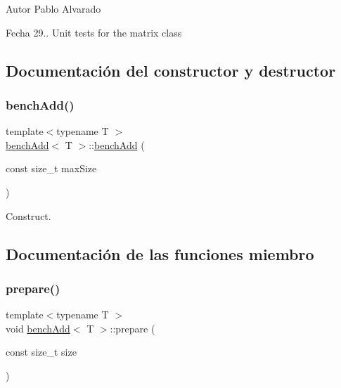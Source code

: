 \begin{DoxyAuthor}{Autor}
Pablo Alvarado 
\end{DoxyAuthor}
\begin{DoxyDate}{Fecha}
29.. Unit tests for the matrix class 
\end{DoxyDate}


\subsection{Documentación del constructor y destructor}
\mbox{\label{classbenchAdd_a87c319715895c7741c5450232a80a54d}} 
\subsubsection{\texorpdfstring{bench\+Add()}{benchAdd()}}
{\footnotesize\ttfamily template$<$typename T $>$ \\
\hyperlink{classbenchAdd}{bench\+Add}$<$ T $>$\+::\hyperlink{classbenchAdd}{bench\+Add} (\begin{DoxyParamCaption}\item[{const size\+\_\+t}]{max\+Size }\end{DoxyParamCaption})\hspace{0.3cm}{\ttfamily [inline]}}



Construct. 



\subsection{Documentación de las funciones miembro}
\mbox{\label{classbenchAdd_a42b0ce6b2d78a84bb89e135517f65d4a}} 
\subsubsection{\texorpdfstring{prepare()}{prepare()}}
{\footnotesize\ttfamily template$<$typename T $>$ \\
void \hyperlink{classbenchAdd}{bench\+Add}$<$ T $>$\+::prepare (\begin{DoxyParamCaption}\item[{const size\+\_\+t}]{size }\end{DoxyParamCaption})\hspace{0.3cm}{\ttfamily [inline]}}



